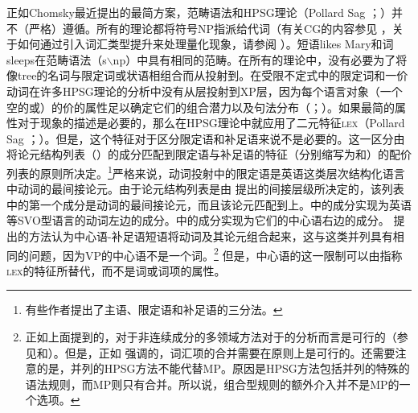 正如Chomsky最近提出的最简方案，范畴语法\citep{Ajdukiewicz35a-u}和HPSG理论（Pollard \biband Sag \citeyear{ps}；\citeyear[--40]{ps2}）并不（严格）遵循\xbartc。所有的理论都将符号NP指派给代词（有关CG的内容参见 ，关于如何通过引入词汇类型提升来处理量化现象，请参阅 ）。短语likes Mary和词sleeps在范畴语法（s$\backslash$np）中具有相同的范畴。在所有的理论中，没有必要为了将像tree的名词与限定词或状语相组合而从\nnullc 投射到\nbarc。在受限不定式中的限定词和一价动词在许多HPSG理论的分析中没有从\xzeroc 层投射到XP层，因为每个语言对象（一个空的\subcatc 或\compslc）的价的属性足以确定它们的组合潜力以及句法分布（\citealp{Mueller96a}；\citealp{Mueller99a}）。如果最简的属性对于现象的描述是必要的，那么在HPSG理论中就应用了二元特征\textsc{lex}（Pollard \biband Sag \citeyear[]{ps}；\citeyear[]{ps2}）。但是，这个特征对于区分限定语和补足语来说不是必要的。这一区分由将论元结构列表（\argstc）的成分匹配到限定语与补足语的特征（分别缩写为\sprc 和\compsc）的配价列表的原则所决定。\footnote{%
有些作者提出了主语、限定语和补足语的三分法。
}严格来说，动词投射中的限定语是英语这类层次结构化语言中动词的最间接论元。由于论元结构列表是由 \citet{KC77a}提出的间接层级所决定的，该列表中的第一个成分是动词的最间接论元，而且该论元匹配到\sprlc 上。\sprlc 中的成分实现为英语等SVO型语言的动词左边的成分。\compslc 中的成分实现为它们的中心语右边的成分。 \citet[, 364]{GSag2000a-u}提出的方法认为中心语-补足语短语将动词及其论元组合起来，这与这类并列具有相同的问题，因为VP的中心语不是一个词。\footnote{%
正如上面提到的，对于非连续成分的多领域方法对于的分析而言是可行的（参见\citet{Crysmann2000a}和\citet{BS2004a}）。但是，正如 \citet{Abeille2006a}强调的，词汇项的合并需要在原则上是可行的。还需要注意的是，并列的HPSG方法不能代替MP。原因是HPSG方法包括并列的特殊的语法规则，而MP则只有合并。所以说，组合型规则的额外介入并不是MP的一个选项。
} 
但是，中心语的这一限制可以由指称\textsc{lex}的特征所替代，而不是词或词项的属性。
